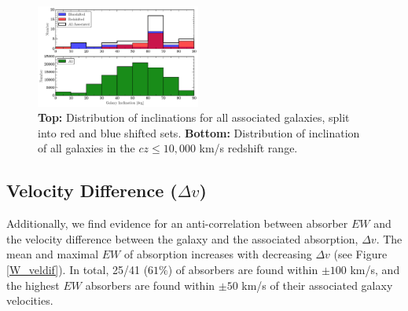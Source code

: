 \documentclass[iop]{emulateapj-rtx4}
\begin{document}
\begin{figure}[h!]
        \centering
        \includegraphics[width=0.48\textwidth]{hist(fancy_inclination)_red_blue_full_all.pdf}
        \caption{\small{\textbf{Top: }Distribution of inclinations for all associated galaxies, split into red and blue shifted sets. \textbf{Bottom:} Distribution of inclination of all galaxies in the $cz \leq 10,000$ km/s redshift range.}}
        \label{hist_inc}
        \vspace{2pt}
\end{figure}

\subsection{Velocity Difference \rm($\Delta v$\rm)}
Additionally, we find evidence for an anti-correlation between absorber $EW$ and the velocity difference between the galaxy and the associated absorption, $\Delta v$. The mean and maximal $EW$ of absorption increases with decreasing $\Delta v$ (see Figure \ref{W_veldif}). In total, 25/41 ($61\%$) of absorbers are found within $\pm100$ km/s, and the highest $EW$ absorbers are found within $\pm50$ km/s  of their associated galaxy velocities.

\vspace{5pt}

% 
  
%
%
\end{document}
